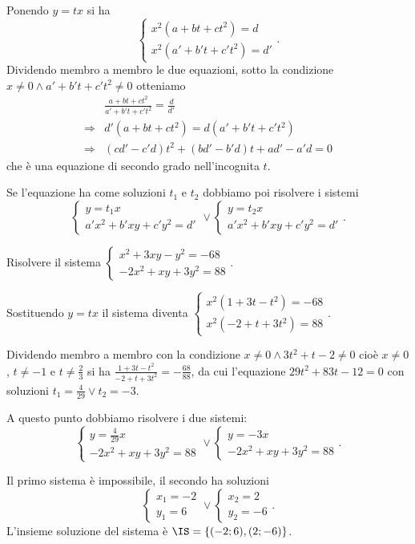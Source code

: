 Ponendo \(y=tx\) si ha 
\[\left\{\begin{array}{l}{x^2(a+{bt}+{ct}^2)=d}\\{x^2(a'+b't+c't^2)=d'}
         \end{array}\right..\]
Dividendo membro a membro le due equazioni, sotto la condizione \(x\neq 0\wedge 
a'+b't+c't^2\neq 0\) otteniamo 
\begin{align*}
&\frac{a+{bt}+{ct}^2}{a'+b't+c't^2}=\frac d{d'}\\
\Rightarrow & d'(a+{bt}+{ct}^2)=d(a'+b't+c't^2)\\
\Rightarrow & ({cd}'-c'd)t^2+({bd}'-b'd)t+{ad}'-a'd=0 
\end{align*}
che è una equazione di secondo grado nell'incognita \(t\).

Se l'equazione ha come soluzioni \(t_1\) e \(t_2\) dobbiamo poi risolvere i 
sistemi \[ \left\{\begin{array}{l}y=t_1x \\a'x^2+b'{xy}+c'y^2=d' 
\end{array}\right.\vee\left\{\begin{array}{l}y=t_2x \\a'x^2+b'{xy}+c'y^2=d' 
\end{array}\right.. \]

\newpage

\begin{esempio}{}{}
Risolvere il sistema \(\left\{\begin{array}{l}x^2+3{xy}-y^2=-68 
\\-2x^2+{xy}+3y^2=88 \end{array}\right.\).

Sostituendo \(y={tx}\) il sistema diventa 
\(\left\{\begin{array}{l}x^2(1+3t-t^2)=-68 \\x^2(-2+t+3t^2)=88 
\end{array}\right.\).

Dividendo membro a membro con la condizione \(x\neq 0\wedge 3t^2+t-2\neq 0\) 
cioè \(x\neq 0\), \(t\neq -1\) e \(t\neq \frac 2 3\) si ha 
\(\frac{1+3t-t^2}{-2+t+3t^2}=-\frac{68}{88}\), da cui l'equazione 
\(29t^2+83t-12=0\) con soluzioni \(t_1=\frac 4{29}\vee t_2=-3\).

A questo punto dobbiamo risolvere i due sistemi:\[ 
\left\{\begin{array}{l}y=\frac 4{29}x \\-2x^2+{xy}+3y^2=88 
\end{array}\right.\vee\left\{\begin{array}{l}y=-3x \\-2x^2+{xy}+3y^2=88 
\end{array}\right.. \]

Il primo sistema è impossibile, il secondo ha soluzioni 
\[\left\{\begin{array}{l}x_1=-2\\y_1=6\end{array}\right.\vee\left\{\begin{array}
{l}x_2=2\\y_2=-6\end{array}\right..\] 
L'insieme soluzione del sistema è \(\IS=\{(-2;6),(2;-6)\}\).
\end{esempio}


